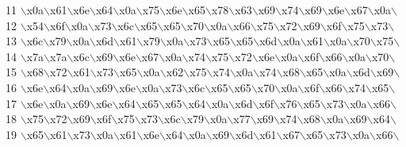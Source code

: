 \begin{DoxyCode}
11 \textcolor{stringliteral}{\(\backslash\)x0a\(\backslash\)x61\(\backslash\)x6e\(\backslash\)x64\(\backslash\)x0a\(\backslash\)x75\(\backslash\)x6e\(\backslash\)x65\(\backslash\)x78\(\backslash\)x63\(\backslash\)x69\(\backslash\)x74\(\backslash\)x69\(\backslash\)x6e\(\backslash\)x67\(\backslash\)x0a\(\backslash\)}
12 \textcolor{stringliteral}{\(\backslash\)x54\(\backslash\)x6f\(\backslash\)x0a\(\backslash\)x73\(\backslash\)x6c\(\backslash\)x65\(\backslash\)x65\(\backslash\)x70\(\backslash\)x0a\(\backslash\)x66\(\backslash\)x75\(\backslash\)x72\(\backslash\)x69\(\backslash\)x6f\(\backslash\)x75\(\backslash\)x73\(\backslash\)}
13 \textcolor{stringliteral}{\(\backslash\)x6c\(\backslash\)x79\(\backslash\)x0a\(\backslash\)x6d\(\backslash\)x61\(\backslash\)x79\(\backslash\)x0a\(\backslash\)x73\(\backslash\)x65\(\backslash\)x65\(\backslash\)x6d\(\backslash\)x0a\(\backslash\)x61\(\backslash\)x0a\(\backslash\)x70\(\backslash\)x75\(\backslash\)}
14 \textcolor{stringliteral}{\(\backslash\)x7a\(\backslash\)x7a\(\backslash\)x6c\(\backslash\)x69\(\backslash\)x6e\(\backslash\)x67\(\backslash\)x0a\(\backslash\)x74\(\backslash\)x75\(\backslash\)x72\(\backslash\)x6e\(\backslash\)x0a\(\backslash\)x6f\(\backslash\)x66\(\backslash\)x0a\(\backslash\)x70\(\backslash\)}
15 \textcolor{stringliteral}{\(\backslash\)x68\(\backslash\)x72\(\backslash\)x61\(\backslash\)x73\(\backslash\)x65\(\backslash\)x0a\(\backslash\)x62\(\backslash\)x75\(\backslash\)x74\(\backslash\)x0a\(\backslash\)x74\(\backslash\)x68\(\backslash\)x65\(\backslash\)x0a\(\backslash\)x6d\(\backslash\)x69\(\backslash\)}
16 \textcolor{stringliteral}{\(\backslash\)x6e\(\backslash\)x64\(\backslash\)x0a\(\backslash\)x69\(\backslash\)x6e\(\backslash\)x0a\(\backslash\)x73\(\backslash\)x6c\(\backslash\)x65\(\backslash\)x65\(\backslash\)x70\(\backslash\)x0a\(\backslash\)x6f\(\backslash\)x66\(\backslash\)x74\(\backslash\)x65\(\backslash\)}
17 \textcolor{stringliteral}{\(\backslash\)x6e\(\backslash\)x0a\(\backslash\)x69\(\backslash\)x6e\(\backslash\)x64\(\backslash\)x65\(\backslash\)x65\(\backslash\)x64\(\backslash\)x0a\(\backslash\)x6d\(\backslash\)x6f\(\backslash\)x76\(\backslash\)x65\(\backslash\)x73\(\backslash\)x0a\(\backslash\)x66\(\backslash\)}
18 \textcolor{stringliteral}{\(\backslash\)x75\(\backslash\)x72\(\backslash\)x69\(\backslash\)x6f\(\backslash\)x75\(\backslash\)x73\(\backslash\)x6c\(\backslash\)x79\(\backslash\)x0a\(\backslash\)x77\(\backslash\)x69\(\backslash\)x74\(\backslash\)x68\(\backslash\)x0a\(\backslash\)x69\(\backslash\)x64\(\backslash\)}
19 \textcolor{stringliteral}{\(\backslash\)x65\(\backslash\)x61\(\backslash\)x73\(\backslash\)x0a\(\backslash\)x61\(\backslash\)x6e\(\backslash\)x64\(\backslash\)x0a\(\backslash\)x69\(\backslash\)x6d\(\backslash\)x61\(\backslash\)x67\(\backslash\)x65\(\backslash\)x73\(\backslash\)x0a\(\backslash\)x66\(\backslash\)}

\end{DoxyCode}
